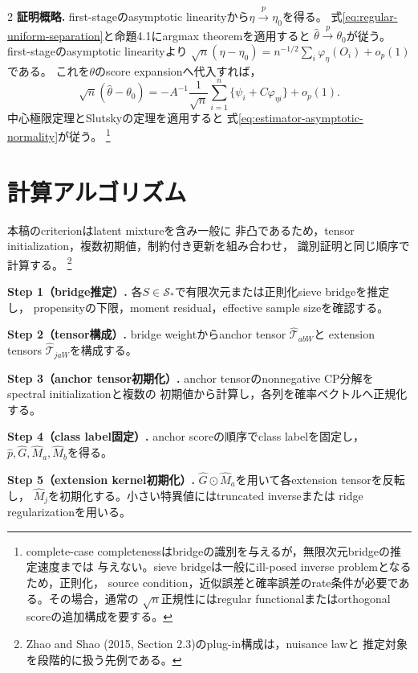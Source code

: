 \documentclass[a4paper,10pt]{article}
\begin{document}
\begin{multicols}{2}
\noindent\textbf{証明概略.}
first-stageのasymptotic linearityから$\widehat\eta\xrightarrow{p}\eta_0$を得る。
式\eqref{eq:regular-uniform-separation}と命題4.1にargmax theoremを適用すると
$\widehat\theta\xrightarrow{p}\theta_0$が従う。
first-stageのasymptotic linearityより
$\sqrt n(\widehat\eta-\eta_0)=n^{-1/2}\sum_i\varphi_\eta(O_i)+o_p(1)$である。
これを$\theta$のscore expansionへ代入すれば，
\begin{equation}
\sqrt n(\widehat\theta-\theta_0)
=-A^{-1}\frac1{\sqrt n}\sum_{i=1}^n
\{\psi_i+C\varphi_{\eta i}\}+o_p(1).
\label{eq:stacked-score-expansion}
\end{equation}
中心極限定理とSlutskyの定理を適用すると
式\eqref{eq:estimator-asymptotic-normality}が従う。%
\footnote{complete-case completenessはbridgeの識別を与えるが，無限次元bridgeの推定速度までは
与えない。sieve bridgeは一般にill-posed inverse problemとなるため，正則化，
source condition，近似誤差と確率誤差のrate条件が必要である。その場合，通常の
$\sqrt n$正規性にはregular functionalまたはorthogonal scoreの追加構成を要する。}

\section{計算アルゴリズム}
本稿のcriterionはlatent mixtureを含み一般に
非凸であるため，tensor initialization，複数初期値，制約付き更新を組み合わせ，
識別証明と同じ順序で計算する。%
\footnote{Zhao and Shao (2015, Section 2.3)のplug-in構成は，nuisance lawと
推定対象を段階的に扱う先例である。}

\noindent\textbf{Step 1（bridge推定）.}
各$S\in\mathcal S_*$で有限次元または正則化sieve bridgeを推定し，
propensityの下限，moment residual，effective sample sizeを確認する。

\noindent\textbf{Step 2（tensor構成）.}
bridge weightからanchor tensor $\widehat{\mathcal T}_{abW}$と
extension tensors $\widehat{\mathcal T}_{jaW}$を構成する。

\noindent\textbf{Step 3（anchor tensor初期化）.}
anchor tensorのnonnegative CP分解をspectral initializationと複数の
初期値から計算し，各列を確率ベクトルへ正規化する。

\noindent\textbf{Step 4（class label固定）.}
anchor scoreの順序でclass labelを固定し，$\widehat p,\widehat G,
\widehat M_a,\widehat M_b$を得る。

\noindent\textbf{Step 5（extension kernel初期化）.}
$\widehat G\odot\widehat M_a$を用いて各extension tensorを反転し，
$\widehat M_j$を初期化する。小さい特異値にはtruncated inverseまたは
ridge regularizationを用いる。


\end{multicols}
\end{document}
